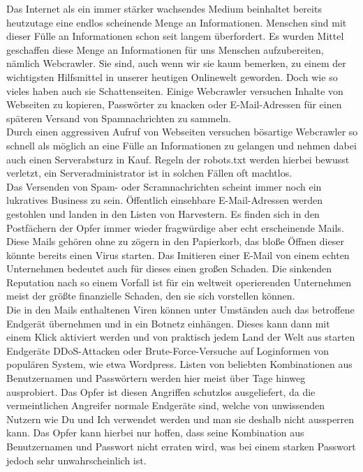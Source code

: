 Das Internet als ein immer stärker wachsendes Medium beinhaltet bereits heutzutage eine endlos scheinende Menge an Informationen. Menschen sind mit dieser Fülle an Informationen schon seit langem überfordert. Es wurden Mittel geschaffen diese Menge an Informationen für uns Menschen aufzubereiten, nämlich Webcrawler. Sie sind, auch wenn wir sie kaum bemerken, zu einem der wichtigsten Hilfsmittel in unserer heutigen Onlinewelt geworden. Doch wie so vieles haben auch sie Schattenseiten. Einige Webcrawler versuchen Inhalte von Webseiten zu kopieren, Passwörter zu knacken oder E-Mail-Adressen für einen späteren Versand von Spamnachrichten zu sammeln.\\
Durch einen aggressiven Aufruf von Webseiten versuchen bösartige Webcrawler so schnell als möglich an eine Fülle an Informationen zu gelangen und nehmen dabei auch einen Serverabsturz in Kauf. Regeln der robots.txt werden hierbei bewusst verletzt, ein Serveradministrator ist in solchen Fällen oft machtlos.\\
Das Versenden von Spam- oder Scramnachrichten scheint immer noch ein lukratives Business zu sein. Öffentlich einsehbare E-Mail-Adressen werden gestohlen und landen in den Listen von Harvestern. Es finden sich in den Postfächern der Opfer immer wieder fragwürdige aber echt erscheinende Mails. Diese Mails gehören ohne zu zögern in den Papierkorb, das bloße Öffnen dieser könnte bereits einen Virus starten. Das Imitieren einer E-Mail von einem echten Unternehmen bedeutet auch für dieses einen großen Schaden. Die sinkenden Reputation nach so einem Vorfall ist für ein weltweit operierenden Unternehmen meist der größte finanzielle Schaden, den sie sich vorstellen können.\\
Die in den Mails enthaltenen Viren können unter Umständen auch das betroffene Endgerät übernehmen und in ein Botnetz einhängen. Dieses kann dann mit einem Klick aktiviert werden und von praktisch jedem Land der Welt aus starten Endgeräte DDoS-Attacken oder Brute-Force-Versuche auf Loginformen von populären System, wie etwa Wordpress. Listen von beliebten Kombinationen aus Benutzernamen und Passwörtern werden hier meist über Tage hinweg ausprobiert. Das Opfer ist diesen Angriffen schutzlos ausgeliefert, da die vermeintlichen Angreifer normale Endgeräte sind, welche von unwissenden Nutzern wie Du und Ich verwendet werden und man sie deshalb nicht aussperren kann. Das Opfer kann hierbei nur hoffen, dass seine Kombination aus Benutzernamen und Passwort nicht erraten wird, was bei einem starken Passwort jedoch sehr unwahrscheinlich ist.
